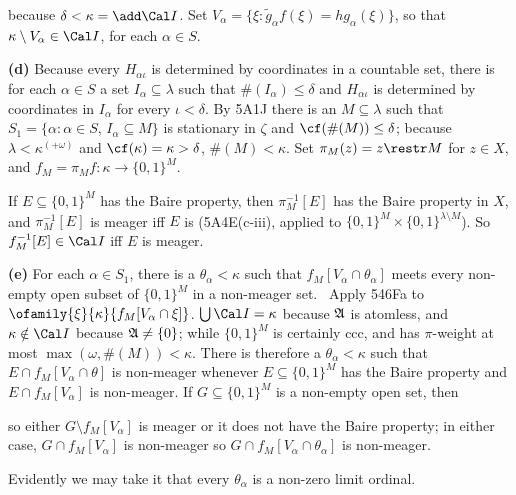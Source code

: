 {\noindent because $\delta<\kappa=\add\Cal I$.
Set $V_{\alpha}=\{\xi:\tilde g_{\alpha}f(\xi)=hg_{\alpha}(\xi)\}$, so
that $\kappa\setminus V_{\alpha}\in\Cal I$, for each $\alpha\in S$.

\medskip

{\bf (d)} Because every $H_{\alpha\iota}$ is determined by coordinates
in a countable
set, there is for each $\alpha\in S$ a set $I_{\alpha}\subseteq\lambda$
such that $\#(I_{\alpha})\le\delta$ and $H_{\alpha\iota}$ is determined
by coordinates in $I_{\alpha}$ for every $\iota<\delta$.
By 5A1J there is an $M\subseteq\lambda$ such that
$S_1=\{\alpha:\alpha\in S$, $I_{\alpha}\subseteq M\}$
is stationary in $\zeta$ and $\cf(\#(M))\le\delta$;  because
$\lambda<\kappa^{(+\omega)}$ and $\cf(\kappa)=\kappa>\delta$,
$\#(M)<\kappa$.   Set $\pi_M(z)=z\restr M$ for $z\in X$,
and $f_M=\pi_Mf:\kappa\to\{0,1\}^M$.

If $E\subseteq\{0,1\}^M$ has the Baire property,
then $\pi_M^{-1}[E]$ has the Baire
property in $X$, and $\pi_M^{-1}[E]$ is meager iff $E$ is
(5A4E(c-iii), applied to $\{0,1\}^M\times\{0,1\}^{\lambda\setminus M}$).
So $f_M^{-1}[E]\in\Cal I$ iff $E$ is meager.

\medskip

{\bf (e)} For each $\alpha\in S_1$, there is a $\theta_{\alpha}<\kappa$
such that $f_M[V_{\alpha}\cap\theta_{\alpha}]$ meets every non-empty open subset of
$\{0,1\}^M$ in a non-meager set.
\Prf\ Apply 546Fa to $\ofamily{\xi}{\kappa}{f_M[V_{\alpha}\cap\xi]}$.
$\bigcup\Cal I=\kappa$ because $\frak A$ is atomless, and
$\kappa\notin\Cal I$ because $\frak A\ne\{0\}$;
while $\{0,1\}^M$ is certainly ccc, and has $\pi$-weight at most
$\max(\omega,\#(M))<\kappa$.   There is therefore
a $\theta_{\alpha}<\kappa$ such that $E\cap f_M[V_{\alpha}\cap\theta]$ is
non-meager whenever $E\subseteq\{0,1\}^M$ has the Baire property
and $E\cap f_M[V_{\alpha}]$ is non-meager.
If $G\subseteq\{0,1\}^M$ is a non-empty open set, then


\noindent so either
$G\setminus f_M[V_{\alpha}]$ is meager or it does not have the
Baire property;  in
either case, $G\cap f_M[V_{\alpha}]$ is non-meager so
$G\cap f_M[V_{\alpha}\cap\theta_{\alpha}]$ is non-meager.\ \Qed

Evidently we may take it that every $\theta_{\alpha}$ is a non-zero
limit ordinal.

\medskip

}
